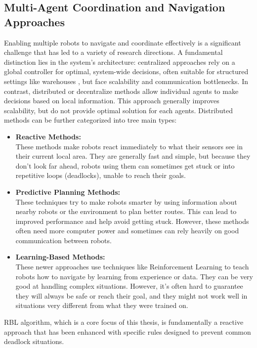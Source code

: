   \subsection{Multi-Agent Coordination and Navigation Approaches}
    Enabling multiple robots to navigate and coordinate effectively is a significant challenge that has led to a variety of research directions.
    A fundamental distinction lies in the system's architecture: centralized approaches rely on a global controller for optimal, system-wide decisions, often suitable for structured settings like warehouses \cite{warehouse_intro}, but face scalability and communication bottlenecks.
    In contrast, distributed or decentralize methods allow individual agents to make decisions based on local information.
    This approach generally improves scalability, but do not provide optimal solution for each agents. 
    Distributed methods can be further categorized into tree main types: 
    \begin{itemize}
      \item \textbf{Reactive Methods: } \\
        These methods make robots react immediately to what their sensors see in their current local area. 
        They are generally fast and simple, but because they don't look far ahead, robots using them can sometimes get stuck or into repetitive loops (deadlocks), unable to reach their goals.
      \item \textbf{Predictive Planning Methods: } \\
        These techniques try to make robots smarter by using information about nearby robots or the environment to plan better routes. 
        This can lead to improved performance and help avoid getting stuck. 
        However, these methods often need more computer power and sometimes can rely heavily on good communication between robots.
      \item \textbf{Learning-Based Methods: } \\
        These newer approaches use techniques like Reinforcement Learning to teach robots how to navigate by learning from experience or data. 
        They can be very good at handling complex situations. 
        However, it's often hard to guarantee they will always be safe or reach their goal, and they might not work well in situations very different from what they were trained on.
    \end{itemize}
    \ac{RBL} algorithm, which is a core focus of this thesis, is fundamentally a reactive approach that has been enhanced with specific rules designed to prevent common deadlock situations.


